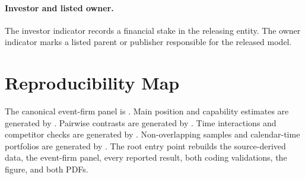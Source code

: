 \documentclass[12pt]{article}
\begin{document}
\paragraph{Investor and listed owner.}
The investor indicator records a financial stake in the releasing entity.
The owner indicator marks a listed parent or publisher responsible for the
released model.

\section{Reproducibility Map}

The canonical event-firm panel is
. Main position and
capability estimates are generated by
.
Pairwise contrasts are generated by
.
Time interactions and competitor checks are generated by
.
Non-overlapping samples and calendar-time portfolios are generated by
.
The root entry point  rebuilds the source-derived
data, the event-firm panel, every reported result, both coding validations,
the figure, and both PDFs.
\end{document}
